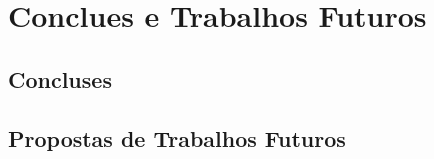 \chapter{Conclues e Trabalhos Futuros}

\section{Concluses}

\section{Propostas de Trabalhos Futuros}